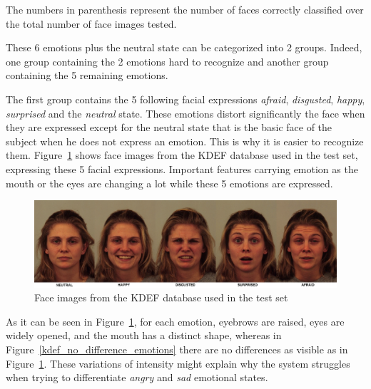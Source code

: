 \noindent The numbers in parenthesis represent the number of faces correctly classified over the total number of face images tested.
\newline

\noindent These 6 emotions plus the neutral state can be categorized into 2 groups. Indeed, one group containing the 2 emotions hard to recognize and another group containing the 5 remaining emotions.
\newline

\noindent The first group contains the 5 following facial expressions \textit{afraid}, \textit{disgusted}, \textit{happy}, \textit{surprised} and the \textit{neutral} state. These emotions distort significantly the face when they are expressed except for the neutral state that is the basic face of the subject when he does not express an emotion. This is why it is easier to recognize them. Figure~\ref{kdef_difference_emotions} shows face images from the KDEF database used in the test set, expressing these 5 facial expressions. Important features carrying emotion as the mouth or the eyes are changing a lot while these 5 emotions are expressed.
\newline

\begin{figure}[!h]
\begin{center}
\noindent \includegraphics[scale=0.4]{figures/kdef_difference_emotions} 
\newline
\caption{Face images from the KDEF database used in the test set}
\label{kdef_difference_emotions}
\end{center} 
\end{figure}

\noindent As it can be seen in Figure~\ref{kdef_difference_emotions}, for each emotion, eyebrows are raised, eyes are widely opened, and the mouth has a distinct shape, whereas in Figure~\ref{kdef_no_difference_emotions} there are no differences as visible as in Figure~\ref{kdef_difference_emotions}. These variations of intensity might explain why the system struggles when trying to differentiate \textit{angry} and \textit{sad} emotional states.
\newline

